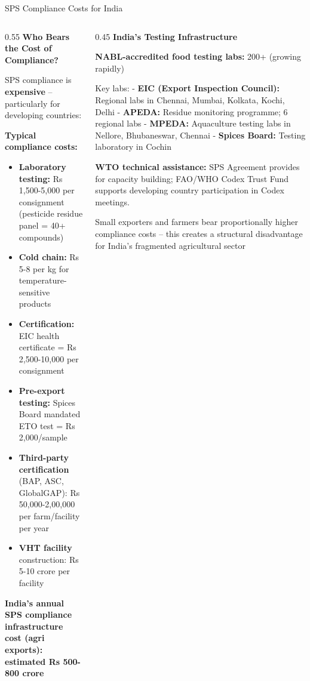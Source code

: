 \documentclass[
  ignorenonframetext,
  aspectratio=169,
]{beamer}
\makeatletter
\providecommand{\tightlist}{%
  \setlength{\itemsep}{0pt}\setlength{\parskip}{0pt}}
\let\quarto@originallabel\label
\DeclareRobustCommand*{\label}[1]{\quarto@originallabel{#1}}
\makeatother
\begin{document}
\begin{frame}{SPS Compliance Costs for India}
\label{sps-compliance-costs-for-india}
\begin{columns}[T]
\begin{column}{0.55\linewidth}
\textbf{Who Bears the Cost of Compliance?}

SPS compliance is \textbf{expensive} -- particularly for developing
countries:

\textbf{Typical compliance costs:}

\begin{itemize}
\tightlist
\item
  \textbf{Laboratory testing:} Rs 1,500-5,000 per consignment (pesticide
  residue panel = 40+ compounds)
\item
  \textbf{Cold chain:} Rs 5-8 per kg for temperature-sensitive products
\item
  \textbf{Certification:} EIC health certificate = Rs 2,500-10,000 per
  consignment
\item
  \textbf{Pre-export testing:} Spices Board mandated ETO test = Rs
  2,000/sample
\item
  \textbf{Third-party certification} (BAP, ASC, GlobalGAP): Rs
  50,000-2,00,000 per farm/facility per year
\item
  \textbf{VHT facility} construction: Rs 5-10 crore per facility
\end{itemize}

\textbf{India's annual SPS compliance infrastructure cost (agri
exports): estimated Rs 500-800 crore}
\end{column}

\begin{column}{0.45\linewidth}
\textbf{India's Testing Infrastructure}

\textbf{NABL-accredited food testing labs:} 200+ (growing rapidly)

Key labs: - \textbf{EIC (Export Inspection Council):} Regional labs in
Chennai, Mumbai, Kolkata, Kochi, Delhi - \textbf{APEDA:} Residue
monitoring programme; 6 regional labs - \textbf{MPEDA:} Aquaculture
testing labs in Nellore, Bhubaneswar, Chennai - \textbf{Spices Board:}
Testing laboratory in Cochin

\textbf{WTO technical assistance:} SPS Agreement provides for capacity
building; FAO/WHO Codex Trust Fund supports developing country
participation in Codex meetings.

Small exporters and farmers bear proportionally higher compliance costs
-- this creates a structural disadvantage for India's fragmented
agricultural sector
\end{column}
\end{columns}
\end{frame}
\end{document}
